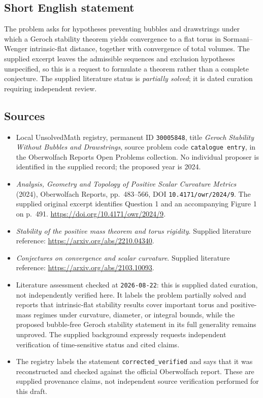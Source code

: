 \documentclass[11pt]{article}
\begin{document}
\subsection{Short English statement}
The problem asks for hypotheses preventing bubbles and drawstrings under which a Geroch stability theorem yields convergence to a flat torus in Sormani--Wenger intrinsic-flat distance, together with convergence of total volumes. The supplied excerpt leaves the admissible sequences and exclusion hypotheses unspecified, so this is a request to formulate a theorem rather than a complete conjecture. The supplied literature status is \emph{partially solved}; it is dated curation requiring independent review.
\subsection{Sources}
\begin{itemize}
\item Local UnsolvedMath registry, permanent ID \texttt{30005848}, title \emph{Geroch Stability Without Bubbles and Drawstrings}, source problem code \texttt{catalogue entry}, in the Oberwolfach Reports Open Problems collection. No individual proposer is identified in the supplied record; the proposed year is 2024.
\item \emph{Analysis, Geometry and Topology of Positive Scalar Curvature Metrics} (2024), Oberwolfach Reports, pp.\ 483--566, DOI \texttt{10.4171/owr/2024/9}. The supplied original excerpt identifies Question 1 and an accompanying Figure 1 on p.\ 491. \url{https://doi.org/10.4171/owr/2024/9}.
\item \emph{Stability of the positive mass theorem and torus rigidity}. Supplied literature reference: \url{https://arxiv.org/abs/2210.04340}.
\item \emph{Conjectures on convergence and scalar curvature}. Supplied literature reference: \url{https://arxiv.org/abs/2103.10093}.
\item Literature assessment checked at \texttt{2026-08-22}: this is supplied dated curation, not independently verified here. It labels the problem partially solved and reports that intrinsic-flat stability results cover important torus and positive-mass regimes under curvature, diameter, or integral bounds, while the proposed bubble-free Geroch stability statement in its full generality remains unproved. The supplied background expressly requests independent verification of time-sensitive status and cited claims.
\item The registry labels the statement \texttt{corrected\_verified} and says that it was reconstructed and checked against the official Oberwolfach report. These are supplied provenance claims, not independent source verification performed for this draft.
\end{itemize}
\end{document}
